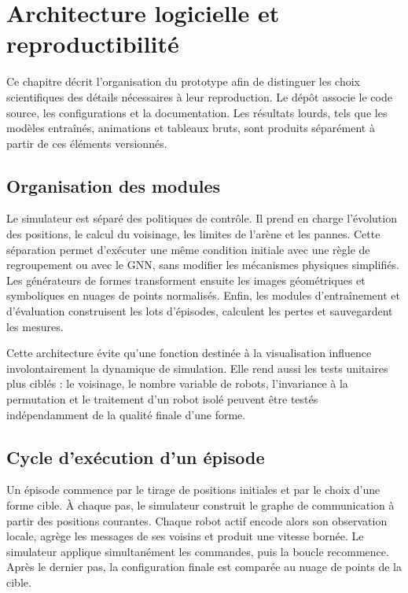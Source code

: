 \chapter{Architecture logicielle et reproductibilité}
\label{chap:architecture}

Ce chapitre décrit l'organisation du prototype afin de distinguer les choix scientifiques des détails nécessaires à leur reproduction. Le dépôt associe le code source, les configurations et la documentation. Les résultats lourds, tels que les modèles entraînés, animations et tableaux bruts, sont produits séparément à partir de ces éléments versionnés.

\section{Organisation des modules}
Le simulateur est séparé des politiques de contrôle. Il prend en charge l'évolution des positions, le calcul du voisinage, les limites de l'arène et les pannes. Cette séparation permet d'exécuter une même condition initiale avec une règle de regroupement ou avec le GNN, sans modifier les mécanismes physiques simplifiés. Les générateurs de formes transforment ensuite les images géométriques et symboliques en nuages de points normalisés. Enfin, les modules d'entraînement et d'évaluation construisent les lots d'épisodes, calculent les pertes et sauvegardent les mesures.

Cette architecture évite qu'une fonction destinée à la visualisation influence involontairement la dynamique de simulation. Elle rend aussi les tests unitaires plus ciblés : le voisinage, le nombre variable de robots, l'invariance à la permutation et le traitement d'un robot isolé peuvent être testés indépendamment de la qualité finale d'une forme.

\section{Cycle d'exécution d'un épisode}
Un épisode commence par le tirage de positions initiales et par le choix d'une forme cible. À chaque pas, le simulateur construit le graphe de communication à partir des positions courantes. Chaque robot actif encode alors son observation locale, agrège les messages de ses voisins et produit une vitesse bornée. Le simulateur applique simultanément les commandes, puis la boucle recommence. Après le dernier pas, la configuration finale est comparée au nuage de points de la cible.

